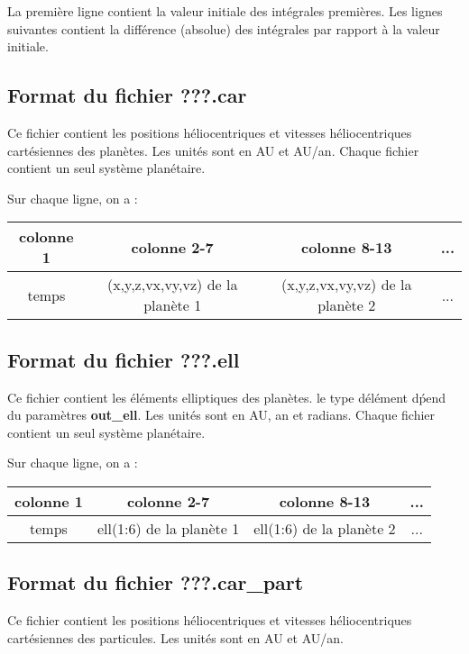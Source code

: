 \documentclass[11pt]{article}
\begin{document}
La premi\`ere ligne contient la valeur initiale des int\'egrales premi\`eres. Les lignes suivantes contient la différence (absolue) des intégrales par rapport à la valeur initiale.


\subsection{Format du fichier {\bf ???.car} }

Ce fichier contient les positions h\'eliocentriques et vitesses h\'eliocentriques cart\'esiennes des plan\`etes. Les unit\'es sont en AU et AU/an.
Chaque fichier contient un seul syst\`eme plan\'etaire.


Sur chaque ligne, on a : 

\begin{tabular}{|c|c|c|c|} \hline
colonne 1 &   colonne 2-7 & colonne 8-13 & ... \\ \hline
temps & (x,y,z,vx,vy,vz) de la plan\`ete 1  & (x,y,z,vx,vy,vz) de la plan\`ete 2 & ... \\    \hline
\end{tabular}

\subsection{Format du fichier {\bf ???.ell} }

Ce fichier contient les \'el\'ements elliptiques des plan\`etes. le type d\'el\'ement d\'pend du param\`etres  {\bf out\_ell}. Les unit\'es sont en AU, an et radians.
Chaque fichier contient un seul syst\`eme plan\'etaire.

Sur chaque ligne, on a : 

\begin{tabular}{|c|c|c|c|} \hline
colonne 1 &   colonne 2-7 & colonne 8-13 & ... \\ \hline
temps & ell(1:6) de la plan\`ete 1  & ell(1:6) de la plan\`ete 2 & ... \\    \hline
\end{tabular}

\subsection{Format du fichier {\bf ???.car\_part} }

Ce fichier contient les positions h\'eliocentriques et vitesses h\'eliocentriques cart\'esiennes des particules. Les unit\'es sont en AU et AU/an.
\end{document}
